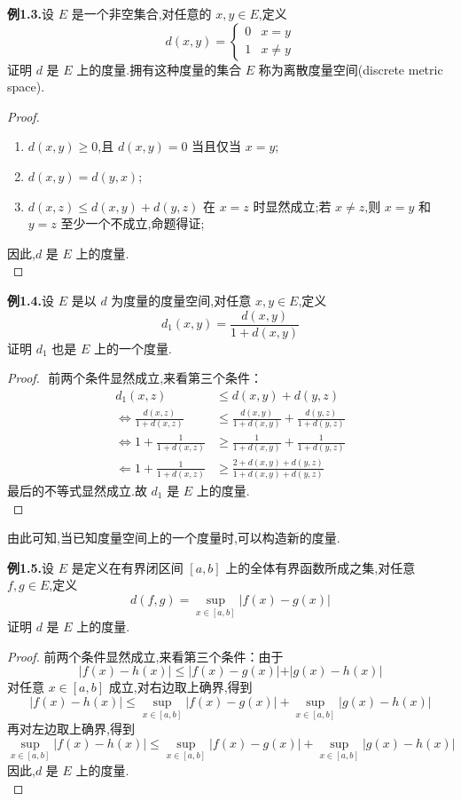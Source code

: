 \documentclass[12pt]{article}
\begin{document}
\textbf{例1.3.}设 $E$ 是一个非空集合,对任意的 $x,y\in E$,定义
$$d(x,y) = \begin{cases} 0 & x=y \\ 1 & x\neq y \end{cases}$$
证明 $d$ 是 $E$ 上的度量.拥有这种度量的集合 $E$ 称为离散度量空间(discrete metric space).
\begin{proof}
    $ $
    \begin{enumerate}[label={\textbullet}]
        \item $d(x,y) \geq 0$,且 $d(x,y) = 0$ 当且仅当 $x=y$;
        \item $d(x,y) = d(y,x)$;
        \item $d(x,z)\leq d(x,y) + d(y,z)$ 在 $x=z$ 时显然成立;若 $x\neq z$,则 $x=y$ 和 $y=z$ 至少一个不成立,命题得证;
    \end{enumerate}
    因此,$d$ 是 $E$ 上的度量.\\
\end{proof}

\textbf{例1.4.}设 $E$ 是以 $d$ 为度量的度量空间,对任意 $x,y\in E$,定义
$$d_1(x,y) = \frac{d(x,y)}{1+d(x,y)}$$
证明 $d_1$ 也是 $E$ 上的一个度量.
\begin{proof}
    $ $
前两个条件显然成立,来看第三个条件：
\[\begin{aligned}
    d_1(x,z)&\leq d(x, y)+d(y,z) \\
  \Longleftrightarrow  \frac{d (x,z)}{1+d(x,z) }&\leq \frac{d(x,y) }{1+d(x,y)}+\frac{d(y,z)}{1+d(y,z)} \\
  \Longleftrightarrow   1+\frac{1}{1+d(x,z)}&\geq \frac{1}{1+d(x,y)}+\frac{1}{1+d (y,z)} \\
  \Longleftarrow 1+\frac{1}{1+d(x,z)}&\geq \frac{2+d(x,y)+d (y,z) }{1+d(x, y)+d(y,z)}
\end{aligned}\]
最后的不等式显然成立.故 $d_1$ 是 $E$ 上的度量.\\
\end{proof}
由此可知,当已知度量空间上的一个度量时,可以构造新的度量.

\textbf{例1.5.}设 $E$ 是定义在有界闭区间 $[a,b]$ 上的全体有界函数所成之集,对任意 $f,g\in E$,定义
$$d(f,g) = \sup_{x\in [a,b]}|f(x)-g(x)|$$
证明 $d$ 是 $E$ 上的度量.
\begin{proof}
    前两个条件显然成立,来看第三个条件：由于
    $$\vert f(x) - h(x)\vert \leq \vert f(x) - g(x)\vert + \vert g(x) - h(x)\vert$$
    对任意 $x\in [a,b]$ 成立,对右边取上确界,得到
    $$\vert f(x) - h(x)\vert \leq \sup_{x\in [a,b]}|f(x)-g(x)| + \sup_{x\in [a,b]}|g(x)-h(x)|$$
    再对左边取上确界,得到
    $$\sup_{x\in [a,b]}|f(x)-h(x)| \leq \sup_{x\in [a,b]}|f(x)-g(x)| + \sup_{x\in [a,b]}|g(x)-h(x)|$$
    因此,$d$ 是 $E$ 上的度量.\\
\end{proof}
\end{document}
